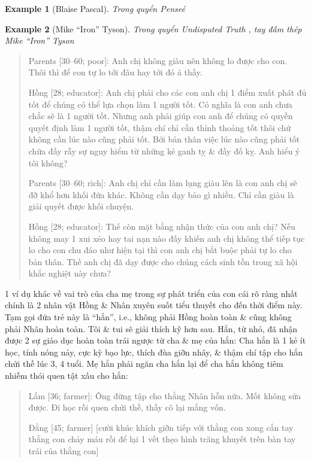 \documentclass[12pt,oneside]{book}
\newtheorem{example}{Example}
\begin{document}
\begin{example}[\sc Blaise Pascal]\rm
	Trong quyển {\it Pense\'e} \cite{Pascal_pensees}
\end{example}

\begin{example}[\sc Mike ``Iron'' Tyson]\rm
	Trong quyển {\it Undisputed Truth} \cite{Tyson_Sloman2013}, tay đấm thép Mike ``Iron'' Tyson
\end{example}

\begin{quote}
	{\sf Parents [30--60; poor]}: Anh chị không giàu nên không lo được cho con. Thôi thì để con tự lo tới đâu hay tới đó á thầy.
	
	{\sf Hồng [28; educator]}: Anh chị phải cho các con anh chị 1 điểm xuất phát đủ tốt để chúng có thể lựa chọn làm 1 người tốt. Có nghĩa là con anh chưa chắc sẽ là 1 người tốt. Nhưng anh phải giúp con anh để chúng có quyền quyết định làm 1 người tốt, thậm chí chỉ cần thỉnh thoảng tốt thôi chứ không cần lúc nào cũng phải tốt. Bởi bản thân việc lúc nào cũng phải tốt chứa đầy rẫy sự nguy hiểm từ những kẻ ganh tỵ \& đầy đố kỵ. Anh hiểu ý tôi không?
	
	{\sf Parents [30--60; rich]}: Anh chị chỉ cần làm lụng giàu lên là con anh chị sẽ đỡ khổ hơn khối đứa khác. Không cần dạy bảo gì nhiều. Chỉ cần giàu là giải quyết được khối chuyện.
	
	{\sf Hồng [28; educator]}: Thế còn mặt bằng nhận thức của con anh chị? Nếu không may 1 xui xẻo hay tai nạn nào đấy khiến anh chị không thể tiếp tục lo cho con chu đáo như hiện tại thì con anh chị bắt buộc phải tự lo cho bản thân. Thế anh chị đã dạy được cho chúng cách sinh tồn trong xã hội khắc nghiệt này chưa?
\end{quote}
1 ví dụ khác về vai trò của cha mẹ trong sự phát triển của con cái rõ ràng nhất chính là 2 nhân vật {\sf Hồng} \& {\sf Nhân} xuyên suốt tiểu thuyết cho đến thời điểm này. Tạm gọi đứa trẻ này là ``hắn'', i.e., không phải {\sf Hồng} hoàn toàn \& cũng không phải {\sf Nhân} hoàn toàn. Tôi \& tui sẽ giải thích kỹ hơn sau. Hắn, từ nhỏ, đã nhận được 2 sự giáo dục hoàn toàn trái ngược từ cha \& mẹ của hắn:
Cha hắn là 1 kẻ ít học, tính nóng nảy, cực kỳ bạo lực, thích đùa giỡn nhây, \& thậm chí tập cho hắn chửi thề lúc 3, 4 tuổi. Mẹ hắn phải ngăn cha hắn lại để cha hắn không tiêm nhiễm thói quen tật xấu cho hắn:
\begin{quote}
	{\sf Lắm [36; farmer]}: Ông đừng tập cho thằng {\sf Nhân} hỗn nữa. Mốt không sửa được. Đi học rồi quen chửi thề, thầy cô lại mắng vốn.
	
	{\sf Đằng [45; farmer]} [cười khúc khích giỡn tiếp với thằng con xong cắn tay thằng con chảy máu rồi để lại 1 vết thẹo hình trăng khuyết trên bàn tay trái của thằng con]
\end{quote}
\end{document}

